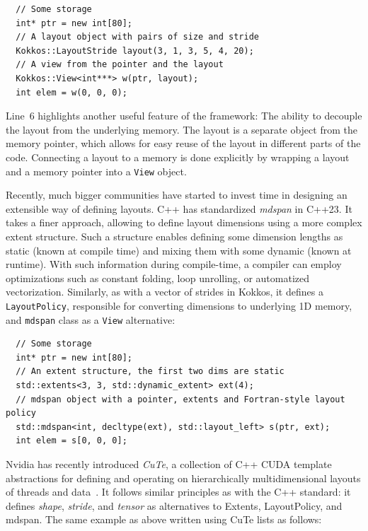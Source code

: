 \begin{verbatim}
  // Some storage
  int* ptr = new int[80];
  // A layout object with pairs of size and stride
  Kokkos::LayoutStride layout(3, 1, 3, 5, 4, 20);
  // A view from the pointer and the layout
  Kokkos::View<int***> w(ptr, layout);
  int elem = w(0, 0, 0);
\end{verbatim}

Line~$6$ highlights another useful feature of the framework: The ability to decouple the layout from the underlying memory. The layout is a separate object from the memory pointer, which allows for easy reuse of the layout in different parts of the code. Connecting a layout to a memory is done explicitly by wrapping a layout and a memory pointer into a \texttt{View} object.

Recently, much bigger communities have started to invest time in designing an extensible way of defining layouts. C++ has standardized \emph{mdspan} in C++23. It takes a finer approach, allowing to define layout dimensions using a more complex extent structure. Such a structure enables defining some dimension lengths as static (known at compile time) and mixing them with some dynamic (known at runtime). With such information during compile-time, a compiler can employ optimizations such as constant folding, loop unrolling, or automatized vectorization. Similarly, as with a vector of strides in Kokkos, it defines a \texttt{LayoutPolicy}, responsible for converting dimensions to underlying 1D memory, and \texttt{mdspan} class as a \texttt{View} alternative:

\begin{verbatim}
  // Some storage
  int* ptr = new int[80];
  // An extent structure, the first two dims are static
  std::extents<3, 3, std::dynamic_extent> ext(4);
  // mdspan object with a pointer, extents and Fortran-style layout policy
  std::mdspan<int, decltype(ext), std::layout_left> s(ptr, ext);
  int elem = s[0, 0, 0];
\end{verbatim}

Nvidia has recently introduced \emph{CuTe}, a collection of C++ CUDA template abstractions for defining and operating on hierarchically multidimensional layouts of threads and data~\cite{cute-online}. It follows similar principles as with the C++ standard: it defines \emph{shape}, \emph{stride}, and \emph{tensor} as alternatives to Extents, LayoutPolicy, and mdspan. The same example as above written using CuTe lists as follows:

